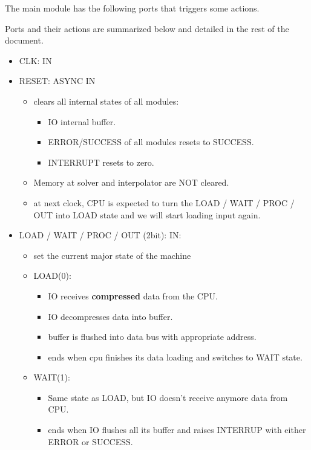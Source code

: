 \documentclass[12pt]{report}
\begin{document}
The main module has the following ports that triggers some actions. 

Ports and their actions are summarized below and detailed in the rest of the document.
\begin{itemize}
    \item CLK: IN
    \item RESET: ASYNC IN
    \begin{itemize}
        \item clears all internal states of all modules:
        \begin{itemize}
            \item IO internal buffer.
            \item ERROR/SUCCESS of all modules resets to SUCCESS.
            \item INTERRUPT resets to zero.
        \end{itemize}
        \item Memory at solver and interpolator are NOT cleared.
        \item at next clock, CPU is expected to turn the {LOAD / WAIT / PROC / OUT} into {LOAD} state and we will start loading input again.
    \end{itemize}
    \item LOAD / WAIT / PROC / OUT (2bit): IN:
    \begin{itemize}
        \item set the current major state of the machine
        \item LOAD(0):
        \begin{itemize}
            \item IO receives \textbf{compressed} data from the CPU.
            \item IO decompresses data into buffer.
            \item buffer is flushed into data bus with appropriate address.
            \item ends when cpu finishes its data loading and switches to {WAIT} state.
        \end{itemize}
        \item WAIT(1):
        \begin{itemize}
            \item Same state as {LOAD}, but IO doesn't receive anymore data from CPU.
            \item ends when IO flushes all its buffer and raises {INTERRUP} with either {ERROR} or {SUCCESS}.
        \end{itemize}

\end{itemize}
\end{itemize}
\end{document}
